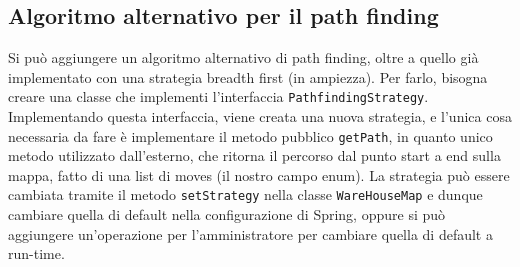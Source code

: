 \subsection{Algoritmo alternativo per il path finding}
Si può aggiungere un algoritmo alternativo di path finding, oltre a quello già implementato con una strategia breadth first (in ampiezza).
Per farlo, bisogna creare una classe che implementi l'interfaccia \texttt{PathfindingStrategy}. Implementando questa interfaccia, viene creata una nuova strategia, e l'unica cosa necessaria da fare è implementare il metodo pubblico \texttt{getPath}, in quanto unico metodo utilizzato dall'esterno, che ritorna il percorso dal punto start a end sulla mappa, fatto di una list di moves (il nostro campo enum).
La strategia può essere cambiata tramite il metodo \texttt{setStrategy} nella classe \texttt{WareHouseMap} e dunque cambiare quella di default nella configurazione di Spring, oppure si può aggiungere un'operazione per l'amministratore per cambiare quella di default a run-time.

